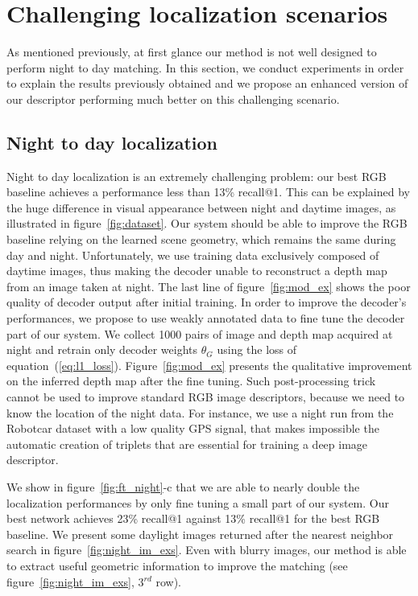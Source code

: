 \section{Challenging localization scenarios}
\label{sec:chall_loc}

As mentioned previously, at first glance our method is not well designed to perform night to day matching. In this section, we conduct experiments in order to explain the results previously obtained and we propose an enhanced version of our descriptor performing much better on this challenging scenario.

\subsection{Night to day localization}
\label{subsec:night2day}

Night to day localization is an extremely challenging problem: our best RGB baseline achieves a performance less than 13\% recall@1. This can be explained by the huge difference in visual appearance between night and daytime images, as illustrated in figure~\ref{fig:dataset}. Our system should be able to improve the RGB baseline relying on the learned scene geometry, which remains the same during day and night. Unfortunately, we use training data exclusively composed of daytime images, thus making the decoder unable to reconstruct a depth map from an image taken at night. The last line of figure~\ref{fig:mod_ex} shows the poor quality of decoder output after initial training. In order to improve the decoder's performances, we propose to use weakly annotated data to fine tune the decoder part of our system. We collect 1000 pairs of image and depth map acquired at night and retrain only decoder weights $\theta_G$ using the loss of equation~(\ref{eq:l1_loss}). Figure~\ref{fig:mod_ex} presents the qualitative improvement on the inferred depth map after the fine tuning. Such post-processing trick cannot be used to improve standard RGB image descriptors, because we need to know the location of the night data. For instance, we use a night run from the Robotcar dataset with a low quality GPS signal, that makes impossible the automatic creation of triplets that are essential for training a deep image descriptor. 

We show in figure~\ref{fig:ft_night}-c that we are able to nearly double the localization performances by only fine tuning a small part of our system. Our best network achieves 23\% recall@1 against 13\% recall@1 for the best RGB baseline. We present some daylight images returned after the nearest neighbor search in figure~\ref{fig:night_im_exs}. Even with blurry images, our method is able to extract useful geometric information to improve the matching (see figure~\ref{fig:night_im_exs}, 3$^{rd}$ row).

